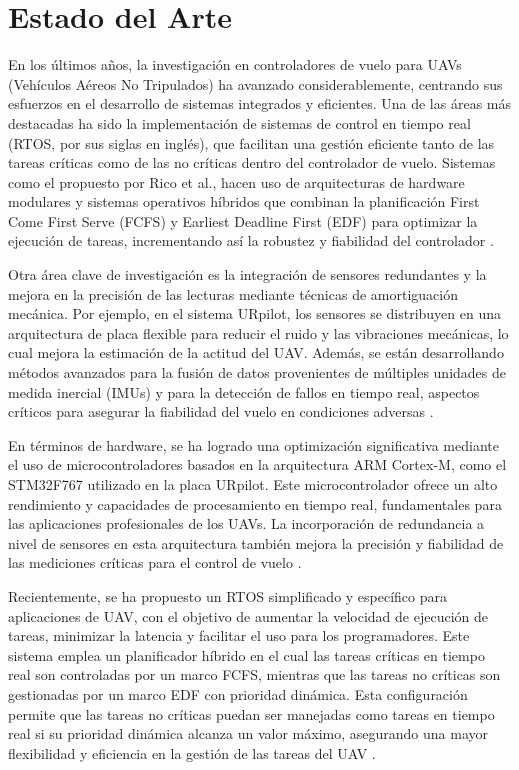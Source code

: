 
\section{Estado del Arte}

En los últimos años, la investigación en controladores de vuelo para UAVs (Vehículos Aéreos No Tripulados) ha avanzado considerablemente, centrando sus esfuerzos en el desarrollo de sistemas integrados y eficientes. Una de las áreas más destacadas ha sido la implementación de sistemas de control en tiempo real (RTOS, por sus siglas en inglés), que facilitan una gestión eficiente tanto de las tareas críticas como de las no críticas dentro del controlador de vuelo. Sistemas como el propuesto por Rico et al., hacen uso de arquitecturas de hardware modulares y sistemas operativos híbridos que combinan la planificación First Come First Serve (FCFS) y Earliest Deadline First (EDF) para optimizar la ejecución de tareas, incrementando así la robustez y fiabilidad del controlador \cite{paper} \cite{rtos}.
\vspace{5px}

Otra área clave de investigación es la integración de sensores redundantes y la mejora en la precisión de las lecturas mediante técnicas de amortiguación mecánica. Por ejemplo, en el sistema URpilot, los sensores se distribuyen en una arquitectura de placa flexible para reducir el ruido y las vibraciones mecánicas, lo cual mejora la estimación de la actitud del UAV. Además, se están desarrollando métodos avanzados para la fusión de datos provenientes de múltiples unidades de medida inercial (IMUs) y para la detección de fallos en tiempo real, aspectos críticos para asegurar la fiabilidad del vuelo en condiciones adversas \cite{rtos}.
\vspace{5px}

En términos de hardware, se ha logrado una optimización significativa mediante el uso de microcontroladores basados en la arquitectura ARM Cortex-M, como el STM32F767 utilizado en la placa URpilot. Este microcontrolador ofrece un alto rendimiento y capacidades de procesamiento en tiempo real, fundamentales para las aplicaciones profesionales de los UAVs. La incorporación de redundancia a nivel de sensores en esta arquitectura también mejora la precisión y fiabilidad de las mediciones críticas para el control de vuelo \cite{rtos}.

\vspace{5px}

Recientemente, se ha propuesto un RTOS simplificado y específico para aplicaciones de UAV, con el objetivo de aumentar la velocidad de ejecución de tareas, minimizar la latencia y facilitar el uso para los programadores. Este sistema emplea un planificador híbrido en el cual las tareas críticas en tiempo real son controladas por un marco FCFS, mientras que las tareas no críticas son gestionadas por un marco EDF con prioridad dinámica. Esta configuración permite que las tareas no críticas puedan ser manejadas como tareas en tiempo real si su prioridad dinámica alcanza un valor máximo, asegurando una mayor flexibilidad y eficiencia en la gestión de las tareas del UAV \cite{rtos}.\\